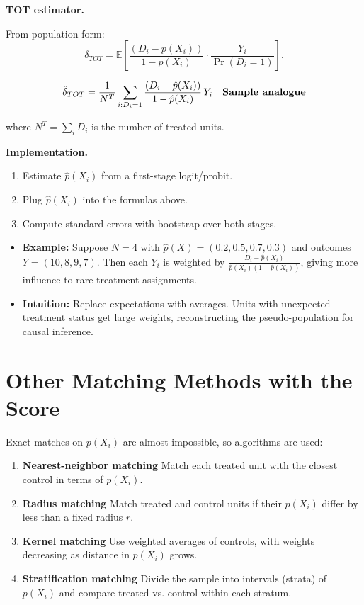\documentclass[12pt]{article}
\begin{document}
\textbf{TOT estimator.}

From population form:
\[
\delta_{TOT} 
   = \mathbb{E}\!\left[\frac{(D_i-p(X_i))}{1-p(X_i)}\cdot \frac{Y_i}{\Pr(D_i=1)}\right].
\]

\singlespacing
\begin{align}
\hat{\delta}_{TOT} 
   &= \frac{1}{N^T}\sum_{i:D_i=1} 
      \frac{(D_i - \hat{p}(X_i))}{1-\hat{p}(X_i)}\,Y_i 
   & \text{\textbf{Sample analogue}}
\end{align}

where $N^T=\sum_i D_i$ is the number of treated units.

\textbf{Implementation.}
\begin{enumerate}
    \item Estimate $\hat{p}(X_i)$ from a first-stage logit/probit.
    \item Plug $\hat{p}(X_i)$ into the formulas above.
    \item Compute standard errors with bootstrap over both stages.
\end{enumerate}

\begin{itemize}
    \item \textbf{Example:} Suppose $N=4$ with $\hat{p}(X)=(0.2,0.5,0.7,0.3)$ and outcomes $Y=(10,8,9,7)$. Then each $Y_i$ is weighted by $\frac{D_i-\hat{p}(X_i)}{\hat{p}(X_i)(1-\hat{p}(X_i))}$, giving more influence to rare treatment assignments.
    \item \textbf{Intuition:} Replace expectations with averages. Units with unexpected treatment status get large weights, reconstructing the pseudo-population for causal inference.
\end{itemize}

\section*{\noindent\textbf{Other Matching Methods with the Score}}

Exact matches on $p(X_i)$ are almost impossible, so algorithms are used:

\begin{enumerate}
    \item \textbf{Nearest-neighbor matching}  
          Match each treated unit with the closest control in terms of $p(X_i)$.
    \item \textbf{Radius matching}  
          Match treated and control units if their $p(X_i)$ differ by less than a fixed radius $r$.
    \item \textbf{Kernel matching}  
          Use weighted averages of controls, with weights decreasing as distance in $p(X_i)$ grows.
    \item \textbf{Stratification matching}  
          Divide the sample into intervals (strata) of $p(X_i)$ and compare treated vs. control within each stratum.
\end{enumerate}
\end{document}
